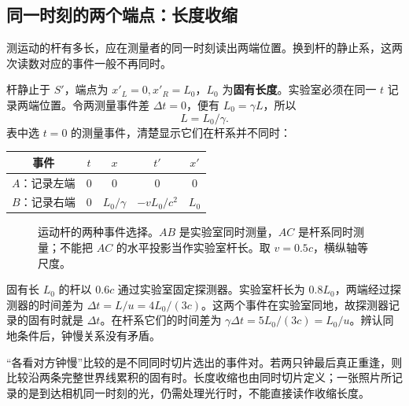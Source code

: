 \subsection{同一时刻的两个端点：长度收缩}
测运动的杆有多长，应在测量者的同一时刻读出两端位置。换到杆的静止系，这两次读数对应的事件一般不再同时。

杆静止于 $S'$，端点为 $x'_L=0,x'_R=L_0$，$L_0$ 为\textbf{固有长度}。实验室必须在同一 $t$ 记录两端位置。令两测量事件差 $\Delta t=0$，便有 $L_0=\gamma L$，所以
\[
\boxed{L=L_0/\gamma.}
\]
表中选 $t=0$ 的测量事件，清楚显示它们在杆系并不同时：
\begin{center}\begin{tabular}{c c c c c}\toprule
事件&$t$&$x$&$t'$&$x'$\\\midrule
$A$：记录左端&$0$&$0$&$0$&$0$\\
$B$：记录右端&$0$&$L_0/\gamma$&$-vL_0/c^2$&$L_0$\\\bottomrule
\end{tabular}\end{center}
\begin{figure}[htbp]\centering
{}
\caption{运动杆的两种事件选择。$AB$ 是实验室同时测量，$AC$ 是杆系同时测量；不能把 $AC$ 的水平投影当作实验室杆长。取 $v=0.5c$，横纵轴等尺度。}\label{fig:sr-rod}
\end{figure}

\begin{example}[杆通过一个探测器]
固有长 $L_0$ 的杆以 $0.6c$ 通过实验室固定探测器。实验室杆长为 $0.8L_0$，两端经过探测器的时间差为 $\Delta t=L/u=4L_0/(3c)$。这两个事件在实验室同地，故探测器记录的固有时就是 $\Delta t$。在杆系它们的时间差为 $\gamma\Delta t=5L_0/(3c)=L_0/u$。辨认同地条件后，钟慢关系没有矛盾。
\end{example}
\begin{physicsbox}
“各看对方钟慢”比较的是不同同时切片选出的事件对。若两只钟最后真正重逢，则比较沿两条完整世界线累积的固有时。长度收缩也由同时切片定义；一张照片所记录的是到达相机同一时刻的光，仍需处理光行时，不能直接读作收缩长度。
\end{physicsbox}

